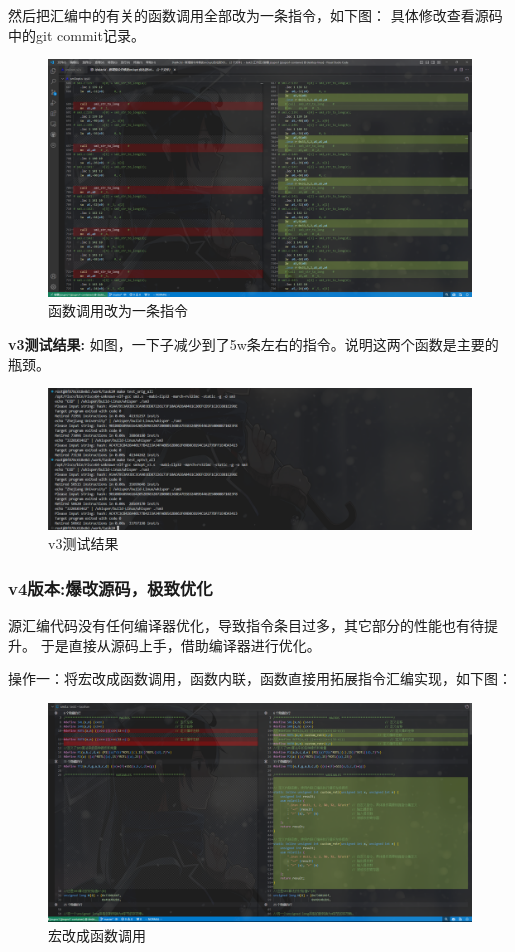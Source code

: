 \documentclass[12pt,hyperref,a4paper,UTF8]{ctexart}
\begin{document}
然后把汇编中的有关的函数调用全部改为一条指令，如下图：
具体修改查看源码中的git commit记录。

  \begin{figure}[H]
      \centering
      \includegraphics[width =1.0\textwidth]{figures/fig/image26.png}
      \caption{函数调用改为一条指令}
  \end{figure}

\textbf{v3测试结果:}
  如图，一下子减少到了5w条左右的指令。说明这两个函数是主要的瓶颈。
  \begin{figure}[H]
      \centering
      \includegraphics[width =1.0\textwidth]{figures/fig/image27.png}
      \caption{v3测试结果}
  \end{figure}

\subsubsection{v4版本:爆改源码，极致优化}
  源汇编代码没有任何编译器优化，导致指令条目过多，其它部分的性能也有待提升。
于是直接从源码上手，借助编译器进行优化。

操作一：将宏改成函数调用，函数内联，函数直接用拓展指令汇编实现，如下图：

  \begin{figure}[H]
      \centering
      \includegraphics[width =1.0\textwidth]{figures/fig/image28.png}
      \caption{宏改成函数调用}
  \end{figure}
\end{document}
